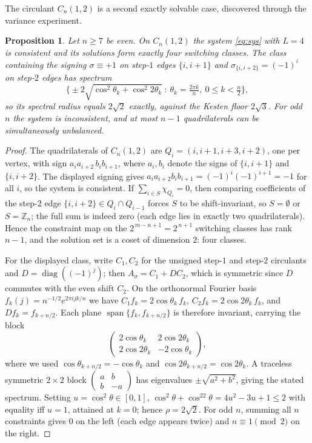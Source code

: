 \documentclass[11pt]{article}
\newtheorem{proposition}[lemma]{Proposition}
\theoremstyle{remark}
\newcommand{\rhomax}{\rho}
\begin{document}
The circulant $C_n(1,2)$ is a second exactly solvable case, discovered
through the variance experiment.

\begin{proposition}\label{prop:circ}
Let $n\ge7$ be even. On $C_n(1,2)$ the system \eqref{eq:sys} with $L=4$
is consistent and its solutions form exactly four switching classes. The
class containing the signing $\sigma\equiv+1$ on step-$1$ edges
$\{i,i{+}1\}$ and $\sigma_{\{i,i+2\}}=(-1)^i$ on step-$2$ edges has
spectrum
\[
\Big\{\pm2\sqrt{\cos^2\theta_k+\cos^2 2\theta_k}\ :\
\theta_k=\tfrac{2\pi k}{n},\ 0\le k<\tfrac n2\Big\},
\]
so its spectral radius equals $2\sqrt2$ exactly, against the Kesten floor
$2\sqrt3$. For odd $n$ the system is inconsistent, and at most $n-1$
quadrilaterals can be simultaneously unbalanced.
\end{proposition}

\begin{proof}
The quadrilaterals of $C_n(1,2)$ are $Q_i=(i,i{+}1,i{+}3,i{+}2)$, one per
vertex, with sign $a_ia_{i+2}\,b_ib_{i+1}$, where $a_i,b_i$ denote the
signs of $\{i,i{+}1\}$ and $\{i,i{+}2\}$. The displayed signing gives
$a_ia_{i+2}b_ib_{i+1}=(-1)^i(-1)^{i+1}=-1$ for all $i$, so the system is
consistent. If $\sum_{i\in S}\chi_{Q_i}=0$, then comparing coefficients
of the step-$2$ edge $\{i,i{+}2\}\in Q_i\cap Q_{i-1}$ forces $S$ to be
shift-invariant, so $S=\emptyset$ or $S=\mathbb{Z}_n$; the full sum is
indeed zero (each edge lies in exactly two quadrilaterals). Hence the
constraint map on the $2^{\,m-n+1}=2^{\,n+1}$ switching classes has rank
$n-1$, and the solution set is a coset of dimension $2$: four classes.

For the displayed class, write $C_1,C_2$ for the unsigned step-$1$ and
step-$2$ circulants and $D=\operatorname{diag}((-1)^j)$; then
$A_\sigma=C_1+DC_2$, which is symmetric since $D$ commutes with the even
shift $C_2$. On the orthonormal Fourier basis
$f_k(j)=n^{-1/2}e^{2\pi ijk/n}$ we have $C_1f_k=2\cos\theta_k\,f_k$,
$C_2f_k=2\cos2\theta_k\,f_k$, and $Df_k=f_{k+n/2}$. Each plane
$\operatorname{span}\{f_k,f_{k+n/2}\}$ is therefore invariant, carrying
the block
\[
\begin{pmatrix} 2\cos\theta_k & 2\cos2\theta_k\\
2\cos2\theta_k & -2\cos\theta_k\end{pmatrix},
\]
where we used $\cos\theta_{k+n/2}=-\cos\theta_k$ and
$\cos2\theta_{k+n/2}=\cos2\theta_k$. A traceless symmetric $2\times2$
block $\left(\begin{smallmatrix}a&b\\ b&-a\end{smallmatrix}\right)$ has
eigenvalues $\pm\sqrt{a^2+b^2}$, giving the stated spectrum. Setting
$u=\cos^2\theta\in[0,1]$,
$\cos^2\theta+\cos^22\theta=4u^2-3u+1\le2$ with equality iff $u=1$,
attained at $k=0$; hence $\rhomax=2\sqrt2$. For odd $n$, summing all $n$
constraints gives $0$ on the left (each edge appears twice) and
$n\equiv1\pmod2$ on the right.
\end{proof}
\end{document}
